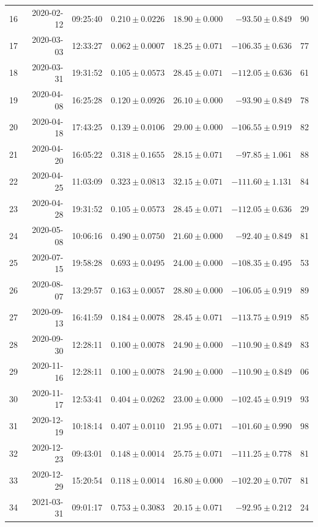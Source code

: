\begin{table}
\begin{tabular}{rrrrrrr}
16 & 2020-02-12 & 09:25:40 & $0.210\pm 0.0226$ & $18.90 \pm 0.000$ & $-93.50 \pm   0.849$ & 90\\
17 & 2020-03-03 & 12:33:27 & $0.062\pm 0.0007$ & $18.25 \pm 0.071$ & $-106.35 \pm 0.636$  & 77\\
18 & 2020-03-31 & 19:31:52 & $0.105\pm 0.0573$ & $28.45 \pm 0.071$ & $-112.05 \pm  0.636$ & 61\\
19 & 2020-04-08 & 16:25:28 & $0.120\pm 0.0926$ & $26.10 \pm 0.000$ & $-93.90 \pm   0.849$ & 78\\
20 & 2020-04-18 & 17:43:25 & $0.139\pm 0.0106$ & $29.00 \pm 0.000$ & $-106.55 \pm  0.919$ & 82\\
21 & 2020-04-20 & 16:05:22 & $0.318\pm 0.1655$ & $28.15 \pm 0.071$ & $-97.85 \pm   1.061$ & 88\\
22 & 2020-04-25 & 11:03:09 & $0.323\pm 0.0813$ & $32.15 \pm 0.071$ & $-111.60 \pm  1.131$ & 84\\
23 & 2020-04-28 & 19:31:52 & $0.105\pm 0.0573$ & $28.45 \pm 0.071$ & $-112.05 \pm  0.636$ & 29\\
24 & 2020-05-08 & 10:06:16 & $0.490\pm 0.0750$ & $21.60 \pm 0.000$ & $-92.40 \pm   0.849$ & 81\\
25 & 2020-07-15 & 19:58:28 & $0.693\pm 0.0495$ & $24.00 \pm 0.000$ & $-108.35 \pm  0.495$ & 53\\
26 & 2020-08-07 & 13:29:57 & $0.163\pm 0.0057$ & $28.80 \pm 0.000$ & $-106.05 \pm  0.919$ & 89\\
27 & 2020-09-13 & 16:41:59 & $0.184\pm 0.0078$ & $28.45 \pm 0.071$ & $-113.75 \pm  0.919$ & 85\\
28 & 2020-09-30 & 12:28:11 & $0.100\pm 0.0078$ & $24.90 \pm 0.000$ & $-110.90 \pm  0.849$ & 83\\
29 & 2020-11-16 & 12:28:11 & $0.100\pm 0.0078$ & $24.90 \pm 0.000$ & $-110.90 \pm  0.849$ & 06\\
30 & 2020-11-17 & 12:53:41 & $0.404\pm 0.0262$ & $23.00 \pm 0.000$ & $-102.45 \pm  0.919$ & 93\\
31 & 2020-12-19 & 10:18:14 & $0.407\pm 0.0110$ & $21.95 \pm 0.071$ & $-101.60 \pm  0.990$ & 98\\
32 & 2020-12-23 & 09:43:01 & $0.148\pm 0.0014$ & $25.75 \pm 0.071$ & $-111.25 \pm  0.778$ & 81\\
33 & 2020-12-29 & 15:20:54 & $0.118\pm 0.0014$ & $16.80 \pm 0.000$ & $-102.20 \pm  0.707$ & 81\\
34 & 2021-03-31 & 09:01:17 & $0.753\pm 0.3083$ & $20.15 \pm 0.071$ & $-92.95 \pm  0.212$  & 24\\\hline
\end{tabular}
\end{table}

